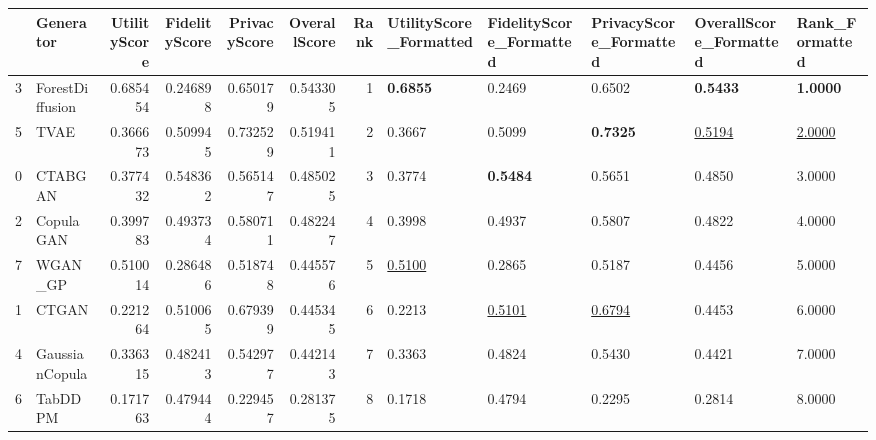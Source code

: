 \begin{tabular}{llrrrrrlllll}
\toprule
 & Generator & UtilityScore & FidelityScore & PrivacyScore & OverallScore & Rank & UtilityScore_Formatted & FidelityScore_Formatted & PrivacyScore_Formatted & OverallScore_Formatted & Rank_Formatted \\
\midrule
3 & ForestDiffusion & 0.685454 & 0.246898 & 0.650179 & 0.543305 & 1 & \textbf{0.6855} & 0.2469 & 0.6502 & \textbf{0.5433} & \textbf{1.0000} \\
5 & TVAE & 0.366673 & 0.509945 & 0.732529 & 0.519411 & 2 & 0.3667 & 0.5099 & \textbf{0.7325} & \underline{0.5194} & \underline{2.0000} \\
0 & CTABGAN & 0.377432 & 0.548362 & 0.565147 & 0.485025 & 3 & 0.3774 & \textbf{0.5484} & 0.5651 & 0.4850 & 3.0000 \\
2 & CopulaGAN & 0.399783 & 0.493734 & 0.580711 & 0.482247 & 4 & 0.3998 & 0.4937 & 0.5807 & 0.4822 & 4.0000 \\
7 & WGAN_GP & 0.510014 & 0.286486 & 0.518748 & 0.445576 & 5 & \underline{0.5100} & 0.2865 & 0.5187 & 0.4456 & 5.0000 \\
1 & CTGAN & 0.221264 & 0.510065 & 0.679399 & 0.445345 & 6 & 0.2213 & \underline{0.5101} & \underline{0.6794} & 0.4453 & 6.0000 \\
4 & GaussianCopula & 0.336315 & 0.482413 & 0.542977 & 0.442143 & 7 & 0.3363 & 0.4824 & 0.5430 & 0.4421 & 7.0000 \\
6 & TabDDPM & 0.171763 & 0.479444 & 0.229457 & 0.281375 & 8 & 0.1718 & 0.4794 & 0.2295 & 0.2814 & 8.0000 \\
\bottomrule
\end{tabular}
